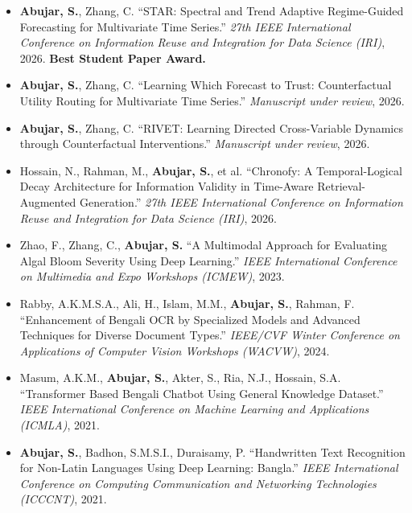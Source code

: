 \documentclass[letterpaper,10pt]{article}
\begin{document}
\begin{itemize}[leftmargin=0.20in,itemsep=4pt,
    topsep=3pt,parsep=0pt,partopsep=0pt]

\item
\textbf{Abujar, S.}, Zhang, C.
``STAR: Spectral and Trend Adaptive Regime-Guided Forecasting for
Multivariate Time Series.''
\textit{27th IEEE International Conference on Information Reuse and
Integration for Data Science (IRI)}, 2026.
\textbf{Best Student Paper Award.}

\item
\textbf{Abujar, S.}, Zhang, C.
``Learning Which Forecast to Trust: Counterfactual Utility Routing
for Multivariate Time Series.''
\textit{Manuscript under review}, 2026.

\item
\textbf{Abujar, S.}, Zhang, C.
``RIVET: Learning Directed Cross-Variable Dynamics through
Counterfactual Interventions.''
\textit{Manuscript under review}, 2026.

\item
Hossain, N., Rahman, M., \textbf{Abujar, S.}, et al.
``Chronofy: A Temporal-Logical Decay Architecture for Information
Validity in Time-Aware Retrieval-Augmented Generation.''
\textit{27th IEEE International Conference on Information Reuse and
Integration for Data Science (IRI)}, 2026.

\item
Zhao, F., Zhang, C., \textbf{Abujar, S.}
``A Multimodal Approach for Evaluating Algal Bloom Severity Using
Deep Learning.''
\textit{IEEE International Conference on Multimedia and Expo Workshops
(ICMEW)}, 2023.

\item
Rabby, A.K.M.S.A., Ali, H., Islam, M.M.,
\textbf{Abujar, S.}, Rahman, F.
``Enhancement of Bengali OCR by Specialized Models and Advanced
Techniques for Diverse Document Types.''
\textit{IEEE/CVF Winter Conference on Applications of Computer Vision
Workshops (WACVW)}, 2024.

\item
Masum, A.K.M., \textbf{Abujar, S.}, Akter, S.,
Ria, N.J., Hossain, S.A.
``Transformer Based Bengali Chatbot Using General Knowledge Dataset.''
\textit{IEEE International Conference on Machine Learning and
Applications (ICMLA)}, 2021.

\item
\textbf{Abujar, S.}, Badhon, S.M.S.I., Duraisamy, P.
``Handwritten Text Recognition for Non-Latin Languages Using Deep
Learning: Bangla.''
\textit{IEEE International Conference on Computing Communication and
Networking Technologies (ICCCNT)}, 2021.

\end{itemize}
\vspace{-5pt}
\end{document}
